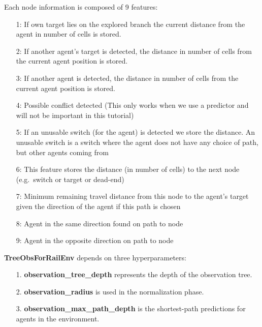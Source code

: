 \documentclass[11pt, a4paper, hidelinks]{report}
\begin{document}
Each node information is composed of 9 features:

\begin{enumerate}
\item [1:]If own target lies on the explored branch the current distance from the agent in number of cells is stored.
\item [2:]If another agent’s target is detected, the distance in number of cells from the current agent position is stored.
\item [3:]If another agent is detected, the distance in number of cells from the current agent position is stored.
\item [4:]Possible conflict detected (This only works when we use a predictor and will not be important in this tutorial)
\item [5:]If an unusable switch (for the agent) is detected we store the distance.
An unusable switch is a switch where the agent does not have any choice of path, but other agents coming from
\item [6:]This feature stores the distance (in number of cells) to the next node (e.g.\ switch or target or dead-end)
\item [7:]Minimum remaining travel distance from this node to the agent’s target given the direction of the agent if this path is chosen
\item [8:]Agent in the same direction found on path to node
\item [9:]Agent in the opposite direction on path to node
\end{enumerate}

\textbf{TreeObsForRailEnv} depends on three hyperparameters:

\begin{enumerate}
\item [1.] \textbf{observation\_tree\_depth} represents the depth of the observation tree.
\item [2.] \textbf{observation\_radius} is used in the normalization phase.
\item [3.] \textbf{observation\_max\_path\_depth} is the shortest-path predictions for agents in the environment.
\end{enumerate}
\end{document}
